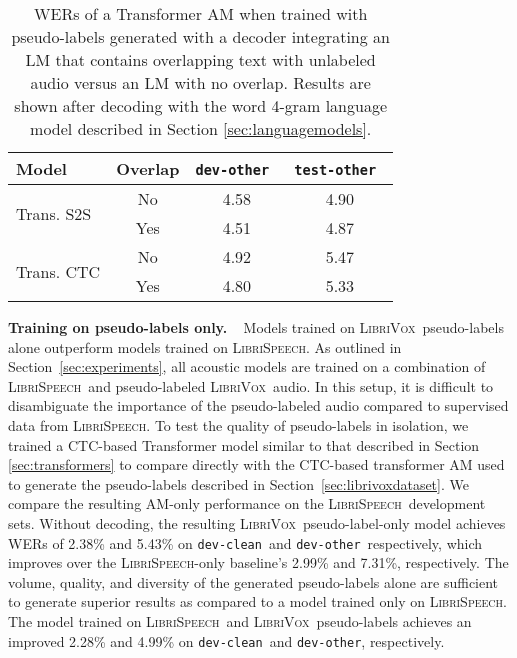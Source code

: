 \documentclass{article}
\def\devclean{\texttt{dev-clean}}
\def\devother{\texttt{dev-other}}
\def\testother{\texttt{test-other}}
\newcommand{\librivox}{\textsc{LibriVox}}
\newcommand{\librispeech}{\textsc{LibriSpeech}}
\begin{document}
\begin{table}[]
\caption{WERs of a Transformer AM when trained with pseudo-labels generated with a decoder integrating an LM that contains overlapping text with unlabeled audio versus an LM with no overlap. Results are shown after decoding with the word 4-gram language model described in Section
\ref{sec:languagemodels}.\label{tab:librivoxlmoverlapablation}}
\vskip 0.1in
\begin{center}
\begin{small}
\begin{sc}
\begin{tabular}{lccc}
    \toprule
        Model & Overlap & \devother~ & \testother~ \\
    \midrule
    \multirow{2}{*}{Trans. S2S} & No & 4.58 & 4.90 \\
    & Yes & 4.51 & 4.87 \\
    \midrule
    \multirow{2}{*}{Trans. CTC} & No & 4.92 & 5.47 \\
    & Yes & 4.80 & 5.33 \\
    \bottomrule
    \end{tabular}\end{sc}
\end{small}
\end{center}
\vskip -0.1in
\end{table}

\textbf{Training on pseudo-labels only.} ~ Models trained on \librivox~pseudo-labels alone outperform models trained on \librispeech. As outlined in Section~\ref{sec:experiments}, all acoustic models are trained on a combination of \librispeech~and pseudo-labeled \librivox~audio. In this setup, it is difficult to disambiguate the importance of the pseudo-labeled audio compared to supervised data from \librispeech. To test the quality of pseudo-labels in isolation, we trained a CTC-based Transformer model similar to that described in Section \ref{sec:transformers} to compare directly with the CTC-based transformer AM used to generate the pseudo-labels described in Section~\ref{sec:librivoxdataset}. We compare the resulting AM-only performance on the \librispeech~development sets. Without decoding, the resulting \librivox~pseudo-label-only model achieves WERs of 2.38\% and 5.43\% on \devclean~and \devother~respectively, which improves over the \librispeech-only baseline's 2.99\% and 7.31\%, respectively. The volume, quality, and diversity of the generated pseudo-labels alone are sufficient to generate superior results as compared to a model trained only on \librispeech. The model trained on \librispeech~and \librivox~pseudo-labels achieves an improved 2.28\% and 4.99\% on \devclean~and \devother, respectively.
\end{document}

